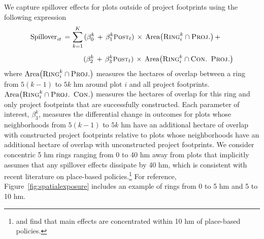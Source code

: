 \documentclass[12pt]{article}
\begin{document}
We capture spillover effects for plots outside of project footprints using the following expression
\begin{align}
\begin{split}
\text{Spillover}_{it} \,=\, &\sum_{k=1}^{K} \, (\beta_{0}^{k} \,+\, \beta_{1}^{k} \textsc{\small Post}_{t})  \, \times \, \text{Area}\big(\textsc{Ring}_i^{k}  \cap  \textsc{Proj.}\big) \, + \\[.5em]
&\hspace{1.7em}(\beta_{2}^{k} \,+\, \beta_{3}^{k} \textsc{\small Post}_{t})  \, \times \,\text{Area}\big(\textsc{Ring}_i^{k}  \cap \textsc{Con. Proj.}\big)
\end{split}
\end{align}
\noindent where $\text{Area}\big(\textsc{Ring}_i^{k}  \cap  \textsc{Proj.}\big)$ measures the  hectares of overlap between a ring from $5(k-1)$ to $5k$ hm around plot $i$ and all project footprints.   $\text{Area}\big(\textsc{Ring}_i^{k}  \cap  \textsc{Proj. Con.}\big)$ measures the hectares of overlap for this ring and only project footprints that are successfully constructed.  Each parameter of interest, $\beta_3^{k}$, measures the differential change in outcomes for plots whose neighborhoods from $5(k-1)$ to $5k$ hm have an additional hectare of overlap with constructed project footprints relative to plots whose neighborhoods have an additional hectare of overlap with unconstructed project footprints.  We consider concentric 5 hm rings ranging from 0 to 40 hm away from plots that implicitly assumes that any spillover effects dissipate by 40 hm, which is consistent with recent literature on place-based policies.\footnote{\cite{diamond2016wants} and \cite{rossi2010housing} find that main effects are concentrated within 10 hm of place-based policies.}   For reference, Figure~\ref{fig:spatialexposure} includes an example of rings from 0 to 5 hm and 5 to 10 hm.
\end{document}
